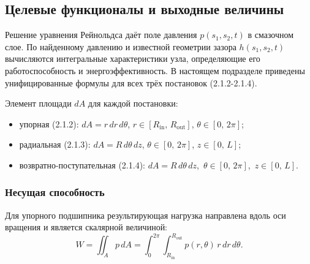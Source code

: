 \subsection{Целевые функционалы и выходные величины}

Решение уравнения Рейнольдса даёт поле давления $p(s_1, s_2, t)$
в смазочном слое. По найденному давлению и известной геометрии
зазора $h(s_1, s_2, t)$ вычисляются интегральные характеристики узла,
определяющие его работоспособность и энергоэффективность.
В настоящем подразделе приведены унифицированные формулы
для всех трёх постановок (2.1.2-2.1.4).

Элемент площади $dA$ для каждой постановки:
\begin{itemize}
  \item упорная (2.1.2): $dA = r\,dr\,d\theta$,\quad
        $r \in [R_{\mathrm{in}},\,R_{\mathrm{out}}]$,\;
        $\theta \in [0,\,2\pi]$;
  \item радиальная (2.1.3): $dA = R\,d\theta\,dz$,\quad
        $\theta \in [0,\,2\pi]$,\; $z \in [0,\,L]$;
  \item возвратно-поступательная (2.1.4): $dA\!=\!R\,d\theta\,dz$,\,
        $\theta\!\in\![0,\,2\pi]$,\, $z\!\in\![0,\,L]$.
\end{itemize}

\subsubsection*{Несущая способность}

Для упорного подшипника результирующая нагрузка направлена вдоль оси
вращения и является скалярной величиной:
\begin{equation}
  W = \iint_A p\,dA
    = \int_0^{2\pi}\!\int_{R_{\mathrm{in}}}^{R_{\mathrm{out}}}
      p(r,\theta)\,r\,dr\,d\theta.
  \label{eq:func_W_thrust}
\end{equation}

